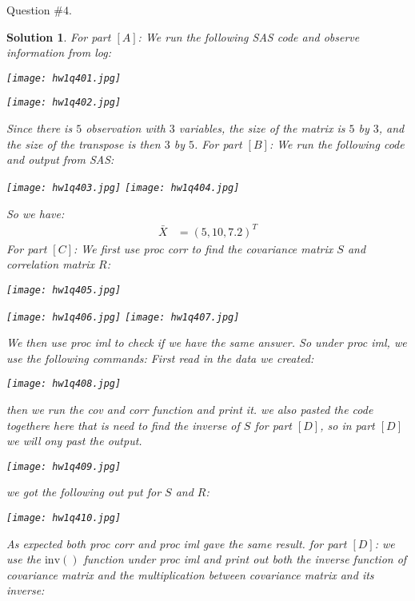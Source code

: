 \documentclass[11pt]{article}\usepackage[]{graphicx}\usepackage[]{color}
\newtheorem{sol}{Solution}
\begin{document}
Question $\# 4.$
\begin{sol}
	For part $[A]$:\vskip 2mm
	We run the following SAS code and observe information from log:
	\begin{center}
		\texttt{[image: hw1q401.jpg]}
	\end{center}
	\begin{center}
		\texttt{[image: hw1q402.jpg]}
	\end{center}
	Since there is $5$ observation with $3$ variables, the size of the matrix is $5$ by $3$, and the size of the transpose is then $3$ by $5$.\vskip 2mm
	For part $[B]$:\vskip 2mm
	We run the following code and output from SAS:
	\begin{center}
		\texttt{[image: hw1q403.jpg]}
		\texttt{[image: hw1q404.jpg]}
	\end{center}
	So we have:
	\begin{align*}
		\bar{X} &= (5, 10, 7.2)^T
	\end{align*}
	For part $[C]$:\vskip 2mm
	We first use proc corr to find the covariance matrix $S$ and correlation matrix $R$:
	\begin{center}
		\texttt{[image: hw1q405.jpg]}
	\end{center}
	\begin{center}
		\texttt{[image: hw1q406.jpg]}
		\hskip 2mm
		\texttt{[image: hw1q407.jpg]}
	\end{center}
	We then use proc iml to check if we have the same answer. So under proc iml, we use the following commands:\vskip 2mm
	First read in the data we created:
	\begin{center}
		\texttt{[image: hw1q408.jpg]}
	\end{center}
	then we run the cov and corr function and print it. we also pasted the code togethere here that is need to find the inverse of $S$ for part $[D]$, so in part $[D]$ we will ony past the output.
	\begin{center}
		\texttt{[image: hw1q409.jpg]}
	\end{center}
	we got the following out put for $S$ and $R$:
	\begin{center}
		\texttt{[image: hw1q410.jpg]}
	\end{center}
	As expected both proc corr and proc iml gave the same result.
	for part $[D]$:\vskip 2mm
	we use the $\text{inv}()$ function under proc iml and print out both the inverse function of covariance matrix and the multiplication between covariance matrix and its inverse:

\end{sol}
\end{document}
